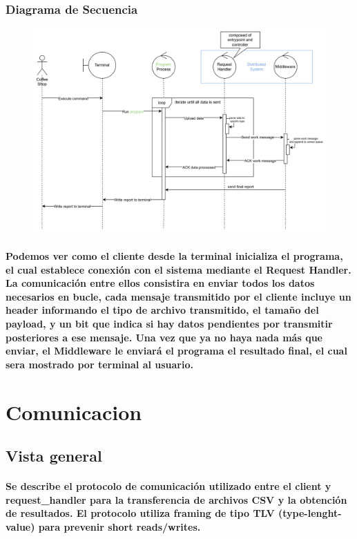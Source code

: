 \documentclass[titlepage,a4paper]{article}
\begin{document}
\subsubsection{Diagrama de Secuencia}

\begin{figure}[H]
    \centering
    \includegraphics[width=0.8\linewidth]{secuencia.png}
\end{figure}
\paragraph{Podemos ver como el cliente desde la terminal inicializa el programa, el cual establece conexión con el sistema mediante el Request Handler. La comunicación entre ellos consistira en enviar todos los datos necesarios en bucle, cada mensaje transmitido por el cliente incluye un header informando el tipo de archivo transmitido, el tamaño del payload, y un bit que indica si hay datos pendientes por transmitir posteriores a ese mensaje. Una vez que ya no haya nada más que enviar, el Middleware le enviará el programa el resultado final, el cual sera mostrado por terminal al usuario.}

\section{Comunicacion}\label{sec:comunicacion}

\subsection{Vista general}
\paragraph{Se describe el protocolo de comunicación utilizado entre el client y request_handler para la transferencia de archivos CSV y la obtención de resultados. El protocolo utiliza framing de tipo TLV (type-lenght-value) para prevenir short reads/writes.}
\end{document}
